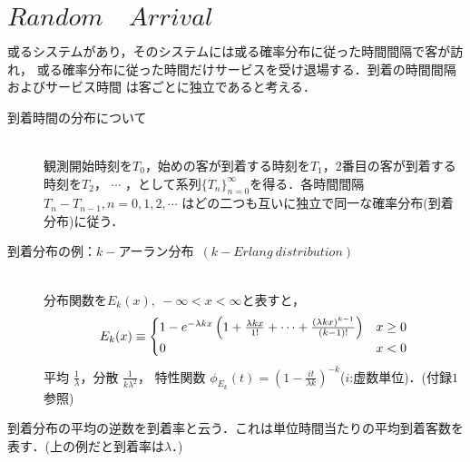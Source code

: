 \documentclass[a4j,papersize,disablejfam,slide,14pt]{jsarticle}
\def\exp#1{\mbox{$ e^{#1} $}} %
\begin{document}
\section{$Random\quad Arrival$}
    \begin{screen}
    或るシステムがあり，そのシステムには或る確率分布に従った時間間隔で客が訪れ，
    或る確率分布に従った時間だけサービスを受け退場する．到着の時間間隔およびサービス時間
    は客ごとに独立であると考える．
    \end{screen}
    \begin{description}
    	\item[到着時間の分布について]\mbox{}\\
    	観測開始時刻を$T_0$，始めの客が到着する時刻を$T_1$，$2$番目の客が到着する時刻を$T_2$，
    	$\cdots$ ，として系列$\{T_n\}_{n=0}^{\infty}$を得る．各時間間隔$T_n - T_{n-1}, n=0,1,2,\cdots$
    	はどの二つも互いに独立で同一な確率分布(到着分布)に従う．
    \end{description}
    \begin{description}
    	\item[到着分布の例：$k-$アーラン分布\ $(k-Erlang\ distribution)$]\mbox{}\\
    		分布関数を$E_k(x),\ -\infty < x < \infty$と表すと，
    		\begin{equation}
    			E_k(x) \equiv
        		\begin{cases}
        			1 - \exp{-\lambda k x} \left( 1 + \frac{\lambda k x}{1!} + \cdots + \frac{(\lambda k x)^{k-1}}{(k-1)!} \right) & \text{$x \geq 0$}\\
    				0 & \text{$x < 0$}
        		\end{cases}
    		\end{equation}
            平均 $\frac{1}{\lambda}$，分散 $\frac{1}{k\lambda^2}$，
            特性関数 $\phi_{E_k}(t) = \left( 1 - \frac{it}{\lambda k} \right)^{-k}$($i$:虚数単位)．(付録$1$参照)
    \end{description}
    到着分布の平均の逆数を到着率と云う．これは単位時間当たりの平均到着客数を表す．(上の例だと到着率は$\lambda$．) \\
	
\end{document}
